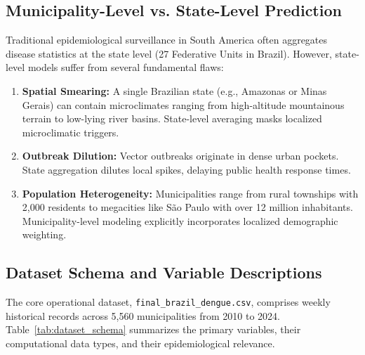 \documentclass[journal,onecolumn,11pt]{IEEEtran}
\begin{document}
\subsection{Municipality-Level vs. State-Level Prediction}
Traditional epidemiological surveillance in South America often aggregates disease statistics at the state level (27 Federative Units in Brazil). However, state-level models suffer from several fundamental flaws:
\begin{enumerate}
    \item \textbf{Spatial Smearing:} A single Brazilian state (e.g., Amazonas or Minas Gerais) can contain microclimates ranging from high-altitude mountainous terrain to low-lying river basins. State-level averaging masks localized microclimatic triggers.
    \item \textbf{Outbreak Dilution:} Vector outbreaks originate in dense urban pockets. State aggregation dilutes local spikes, delaying public health response times.
    \item \textbf{Population Heterogeneity:} Municipalities range from rural townships with 2,000 residents to megacities like São Paulo with over 12 million inhabitants. Municipality-level modeling explicitly incorporates localized demographic weighting.
\end{enumerate}

\subsection{Dataset Schema and Variable Descriptions}
The core operational dataset, \texttt{final\_brazil\_dengue.csv}, comprises weekly historical records across 5,560 municipalities from 2010 to 2024. Table~\ref{tab:dataset_schema} summarizes the primary variables, their computational data types, and their epidemiological relevance.
\end{document}
